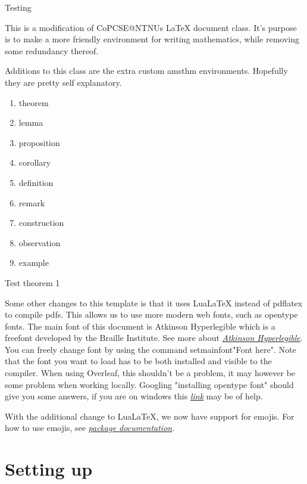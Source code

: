 \documentclass[../thesis.tex]{subfiles}
\begin{document}
Testing


This is a modification of CoPCSE@NTNUs LaTeX document class. It's purpose is to make a more friendly environment for writing mathematics, while removing some redundancy thereof.

Additions to this class are the extra custom amsthm environments. Hopefully they are pretty self explanatory.

\begin{enumerate}
    \item theorem
    \item lemma
    \item proposition
    \item corollary
    \item definition
    \item remark
    \item construction
    \item observation
    \item example
\end{enumerate}

\begin{theorem}
    Test theorem 1
\end{theorem}

Some other changes to this template is that it uses LuaLaTeX instead of pdflatex to compile pdfs. This allows us to use more modern web fonts, such as opentype fonts. The main font of this document is Atkinson Hyperlegible which is a freefont developed by the Braille Institute. See more about \href{https://brailleinstitute.org/freefont}{\textit{Atkinson Hyperlegible}}. You can freely change font by using the command setmainfont{"Font here"}. Note that the font you want to load has to be both installed and visible to the compiler. When using Overleaf, this shouldn't be a problem, it may however be some problem when working locally. Googling "installing opentype font" should give you some answers, if you are on windows this \href{https://www.lifewire.com/installing-truetype-or-opentype-fonts-in-windows-1074134}{\textit{link}} may be of help.

With the additional change to LuaLaTeX, we now have support for emojis. For how to use emojis, see \href{https://texdoc.org/serve/emoji/0}{\textit{package documentation}}.

\section{Setting up}
\end{document}
